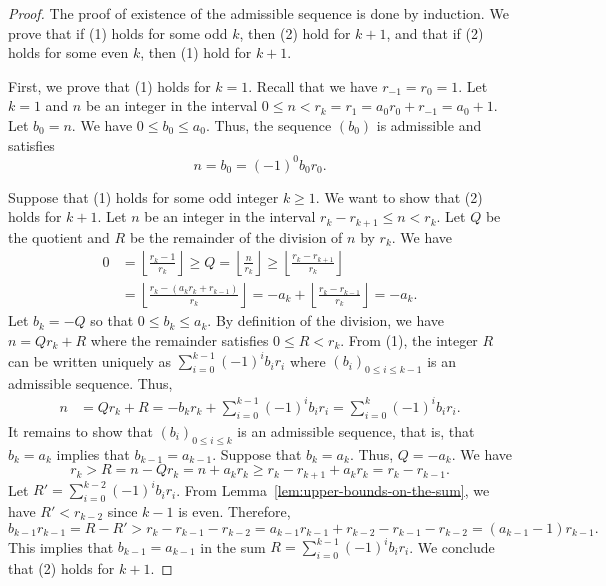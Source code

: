 \documentclass[a4paper,12pt]{amsart}
\newcommand{\0}{\mathtt{0}}
\newcommand{\1}{\mathtt{1}}
\newcommand{\2}{\mathtt{2}}
\newcommand{\3}{\mathtt{3}}
\begin{document}
\begin{proof}
    The proof of existence of the admissible sequence is done by induction.
    We prove that if (1) holds for some odd $k$, then (2) hold for $k+1$,
    and that if (2) holds for some even $k$, then (1) hold for $k+1$.

    First, we prove that (1) holds for $k=1$.
    Recall that we have $r_{-1}=r_0=1$.
    Let $k=1$ and $n$ be an integer in the interval $0\leq n<r_{k}=r_1=a_0r_0+r_{-1}=a_0+1$.
    Let $b_0=n$. We have $0\leq b_0\leq a_0$. Thus, the sequence $(b_0)$ is admissible
    and satisfies
    \[
        n = b_0 = (-1)^{0}b_0r_0.
    \]

    Suppose that (1) holds for some odd integer $k\geq1$.
    We want to show that (2) holds for $k+1$.
    Let $n$ be an integer in the interval
    $r_{k}-r_{k+1}\leq n< r_{k}$.
    Let $Q$ be the quotient and $R$ be the remainder
    of the division of $n$ by $r_{k}$.
    We have
    \begin{align*}
        0
        &=    \left\lfloor
        \frac{r_{k}-1}
             {r_{k}}
            \right\rfloor
        \geq Q
        = \left\lfloor
        \frac{n}
             {r_{k}}
            \right\rfloor
        \geq
            \left\lfloor
        \frac{r_{k}-r_{k+1}}
             {r_{k}}
            \right\rfloor\\
        &=
            \left\lfloor
        \frac{r_{k}-(a_{k}r_{k}+r_{k-1})}
             {r_{k}}
            \right\rfloor
        = - a_{k}
            +
            \left\lfloor
        \frac{r_{k}-r_{k-1}}
             {r_{k}}
            \right\rfloor
        = - a_{k}.
    \end{align*}
    Let $b_{k}=-Q$ so that
    $0\leq b_{k}\leq a_{k}$.
    By definition of the division, we have
    $n=Qr_{k} + R$
    where the remainder satisfies $0\leq R<r_{k}$.
    From (1), the integer $R$
    can be written uniquely as
    $
        \sum_{i=0}^{k-1} (-1)^{i}b_{i}r_{i}
    $
    where $(b_i)_{0\leq i\leq k-1}$ is an admissible sequence.
    Thus,
    \begin{align*}
        n
        &=Qr_{k} + R
         =-b_{k}r_{k} + \sum_{i=0}^{k-1} (-1)^{i}b_{i}r_{i}
         =\sum_{i=0}^{k} (-1)^{i}b_{i}r_{i}.
    \end{align*}
    It remains to show that $(b_i)_{0\leq i\leq k}$ is an admissible sequence,
    that is, that $b_{k}=a_{k}$ implies that $b_{k-1}=a_{k-1}$.
    Suppose that $b_{k}=a_{k}$. Thus, $Q=-a_{k}$.
    We have
    \[
        r_{k}
        > R
        =
        n - Q r_{k}
        =
        n+a_{k}r_{k}
        \geq
        r_{k}-r_{k+1} +a_{k}r_{k}
        =
        r_{k}-r_{k-1}.
    \]
    Let $R'=\sum_{i=0}^{k-2} (-1)^{i}b_{i}r_{i}$.
    From Lemma~\ref{lem:upper-bounds-on-the-sum}, we have $R'<r_{k-2}$ since $k-1$ is even.
    Therefore,
    \[
        b_{k-1}r_{k-1}
        = R - R'
        > r_{k}-r_{k-1} - r_{k-2}
        = a_{k-1}r_{k-1}+r_{k-2}-r_{k-1} - r_{k-2}
        = (a_{k-1}-1)r_{k-1}.
    \]
    This implies that $b_{k-1}=a_{k-1}$ in the sum $R=\sum_{i=0}^{k-1} (-1)^{i}b_{i}r_{i}$.
    We conclude that (2) holds for $k+1$.


\end{proof}
\end{document}

